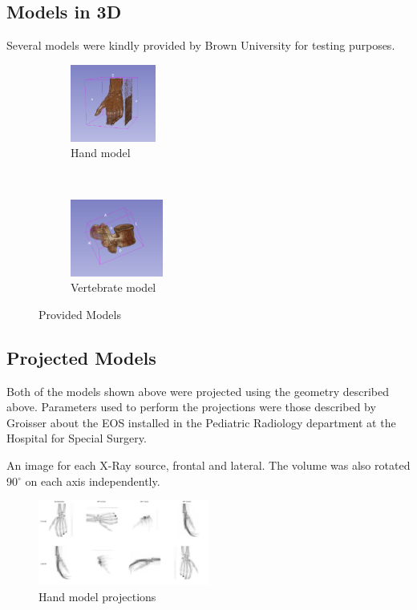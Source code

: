 \documentclass[12pt,twocolumn]{article}
\begin{document}
\subsection{Models in 3D}

Several models were kindly provided by Brown University \cite{AKHBARI2019120} for testing purposes.

\begin{figure}[H]
    \centering
    \begin{subfigure}[t]{0.25\textwidth}
        \centering
        \includegraphics[height=1in]{img/hand-3d.png}
        \caption{Hand model}
    \end{subfigure}%
    ~ 
    \begin{subfigure}[t]{0.25\textwidth}
        \centering
        \includegraphics[height=1in]{img/vert-3d.png}
        \caption{Vertebrate model}
    \end{subfigure}
    \caption{Provided Models}
\end{figure}

\subsection{Projected Models}

Both of the models shown above were projected using the geometry described above. Parameters used to perform the
projections were those described by Groisser \cite{groisser2019geometry} about the EOS\textregistered{} installed 
in the Pediatric Radiology department at the Hospital for Special Surgery.

An image for each X-Ray source, frontal and lateral. The volume was also rotated 90$^{\circ}$ 
on each axis independently.

\begin{figure}[H]
  \begin{center}
    \includegraphics[width=0.5\textwidth]{img/hand_composite_labled.png}
  \end{center}
  \caption{Hand model projections}
\end{figure}
\end{document}
